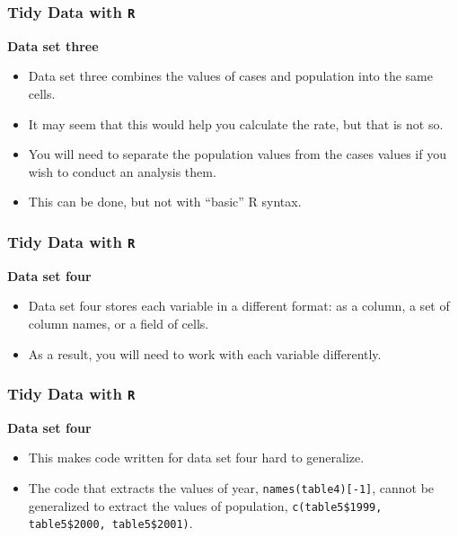 \documentclass[TIDYMASTER.tex]{subfiles}
\begin{document}
\begin{frame}[fragile]
	\frametitle{Tidy Data with \texttt{R}}
	\Large
	\noindent \textbf{Data set three} \\
	\begin{itemize}
\item Data set three combines the values of cases and population into the same cells. \item It may seem that this would help you calculate the rate, but that is not so. 
\item You will need to separate the population values from the cases values if you wish to conduct an analysis them. 
\item This can be done, but not with “basic” R syntax.
	\end{itemize}
%
\end{frame}
\begin{frame}[fragile]
	\frametitle{Tidy Data with \texttt{R}}
	\Large
	\noindent \textbf{Data set four}\\
	\begin{itemize}
		\item Data set four stores each variable in a different format: as a column, a set of column names, or a field of cells. 
		\item As a result, you will need to work with each variable differently. 
	\end{itemize}
	\end{frame}
	\begin{frame}[fragile]
		\frametitle{Tidy Data with \texttt{R}}
		\Large
		\noindent \textbf{Data set four}\\
		\begin{itemize}
		\item This makes code written for data set four hard to generalize. \item The code that extracts the values of year, \texttt{names(table4)[-1]}, cannot be generalized to extract the values of population, \texttt{c(table5\$1999, table5\$2000, table5\$2001)}.
	\end{itemize}
	
\end{frame}
\end{document}
